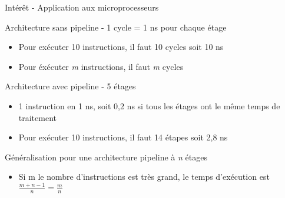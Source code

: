 %
\begin{Frame}{Intérêt - Application aux microprocesseurs}


\begin{block}{Architecture sans pipeline - 1 cycle = 1 ns pour chaque étage}
       \begin{center}
 	\begin{itemize}
         \item Pour exécuter 10 instructions, il faut 10 cycles soit 10 ns
	\item Pour éxécuter \emph{m} instructions, il faut \emph{m} cycles
        \end{itemize}
       \end{center}
      \end{block}   

\begin{block}{Architecture avec pipeline - 5 étages}
       \begin{center}
 	\begin{itemize}
	 \item 1 instruction en 1 ns, soit 0,2 ns si tous les étages ont le même temps de traitement
         \item Pour exécuter 10 instructions, il faut 14 étapes soit 2,8 ns
        \end{itemize}
       \end{center}
      \end{block}   

\begin{block}{Généralisation pour une architecture pipeline à \emph{n} étages}
       \begin{center}
 	\begin{itemize}
         \item Si m le nombre d'instructions est très grand, le temps d'exécution est
	$ \frac{m+n-1}{n} = \frac{m}{n} $
        \end{itemize}
       \end{center}
      \end{block}   

\end{Frame}


